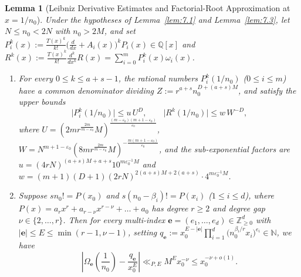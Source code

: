 \documentclass[11pt,reqno]{amsart}
\newtheorem{lemma}[theorem]{Lemma}
\theoremstyle{remark}
\numberwithin{equation}{section}
\newcommand{\N}{\mathbb{N}}
\newcommand{\Z}{\mathbb{Z}}
\newcommand{\Q}{\mathbb{Q}}
\begin{document}
\begin{lemma}[{Leibniz Derivative Estimates and Factorial-Root Approximation at $x = 1/n_0$}]\label{lem:7.4}
Under the hypotheses of Lemma~\ref{lem:7.1} and Lemma~\ref{lem:7.3}, let $N \le n_0 < 2N$ with $n_0 > 2M$, and set $P_i^k(x) := \frac{T(x)^k}{k!}\bigl(\frac{d}{dx} + A_i(x)\bigr)^k P_i(x) \in \Q[x]$ and $R^k(x) := \frac{T(x)^k}{k!}\frac{d^k}{dx^k} R(x) = \sum_{i=0}^m P_i^k(x)\omega_i(x)$.
\begin{enumerate}
\item[(i)] For every $0 \le k \le a + s - 1$, the rational numbers $P_i^k(1/n_0)$ ($0 \le i \le m$) have a common denominator dividing $Z := r^{a+s} n_0^{D + (a+s)M}$, and satisfy the upper bounds
\begin{equation}\label{eq:7.15}
\bigl|P_i^k(1/n_0)\bigr| \le u\,U^D, \qquad \bigl|R^k(1/n_0)\bigr| \le w\,W^{-D},
\end{equation}
where $U = (2mr^{\frac{2m}{m-\varepsilon_0}} M)^{\frac{(m-\varepsilon_0)(m+1-\varepsilon_0)}{\varepsilon_0}}$, $W = N^{m+1-\varepsilon_0}(8mr^{\frac{2m}{m-\varepsilon_0}} M)^{-\frac{m(m+1-\varepsilon_0)}{\varepsilon_0}}$, and the sub-exponential factors are $u = (4rN)^{(a+s)M + a + s} 10^{m\varepsilon_0^{-1}M}$ and $w = (m+1)(D+1)\allowbreak(2rN)^{2(a+s)M + 2(a+s)}\allowbreak \cdot 4^{m\varepsilon_0^{-1}M}$.
\item[(ii)] Suppose $sn_0! = P(x_0)$ and $s(n_0 - \beta_i)! = P(x_i)$ ($1 \le i \le d$), where $P(x) = a_r x^r + a_{r-\nu} x^{r-\nu} + \dots + a_0$ has degree $r \ge 2$ and degree gap $\nu \in \{2, \dots, r\}$. Then for every multi-index $\mathbf{e} = (e_1, \dots, e_d) \in \Z_{\ge 0}^d$ with $|\mathbf{e}| \le E \le \min(r - 1, \nu - 1)$, setting $q_{\mathbf{e}} := x_0^{E - |\mathbf{e}|} \prod_{i=1}^d \bigl(n_0^{\beta_i/r} x_i\bigr)^{e_i} \in \N$, we have
\begin{equation}\label{eq:7.16}
\left|\Omega_{\mathbf{e}}\!\left(\frac{1}{n_0}\right) - \frac{q_{\mathbf{e}}}{x_0^E}\right| \ll_{P,E} M^E x_0^{-\nu} \le x_0^{-\nu + o(1)}.
\end{equation}
\end{enumerate}
\end{lemma}
\end{document}
